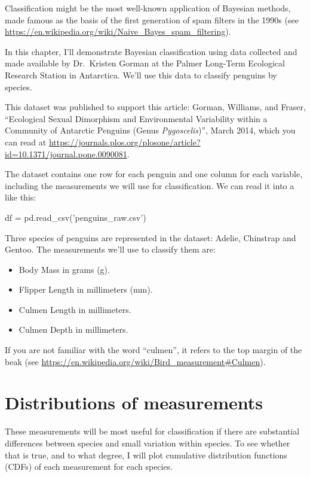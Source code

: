 \documentclass[12pt]{book}
\theoremstyle{exercise}
\begin{document}
Classification might be the most well-known application of Bayesian
methods, made famous as the basis of the first generation of spam
filters in the 1990s (see \url{https://en.wikipedia.org/wiki/Naive_Bayes_spam_filtering}).

In this chapter, I'll demonstrate Bayesian classification using data
collected and made available by Dr.~Kristen Gorman at the Palmer
Long-Term Ecological Research Station in Antarctica. We'll use this data
to classify penguins by species.

This dataset was published to support this article: Gorman, Williams,
and Fraser, ``Ecological
Sexual Dimorphism and Environmental Variability within a Community of
Antarctic Penguins (Genus \emph{Pygoscelis})'', March 2014, which you can read at \url{https://journals.plos.org/plosone/article?id=10.1371/journal.pone.0090081}.

The dataset contains one row for each penguin and one column for each
variable, including the measurements we will use for classification.
We can read it into a  like this:

\begin{code}
df = pd.read_csv('penguins_raw.csv')
\end{code}

Three species of penguins are represented in the dataset: Adelie,
Chinstrap and Gentoo.
The measurements we'll use to classify them are:

\begin{itemize}
\item
  Body Mass in grams (g).
\item
  Flipper Length in millimeters (mm).
\item
  Culmen Length in millimeters.
\item
  Culmen Depth in millimeters.
\end{itemize}

If you are not familiar with the word ``culmen'', it refers to the
top margin of the beak (see \url{https://en.wikipedia.org/wiki/Bird_measurement\#Culmen}).


\section{Distributions of measurements}
\label{distributions-of-measurements}

These measurements will be most useful for classification if there are
substantial differences between species and small variation within
species. To see whether that is true, and to what degree, I will plot
cumulative distribution functions (CDFs) of each measurement for each
species.
\end{document}
